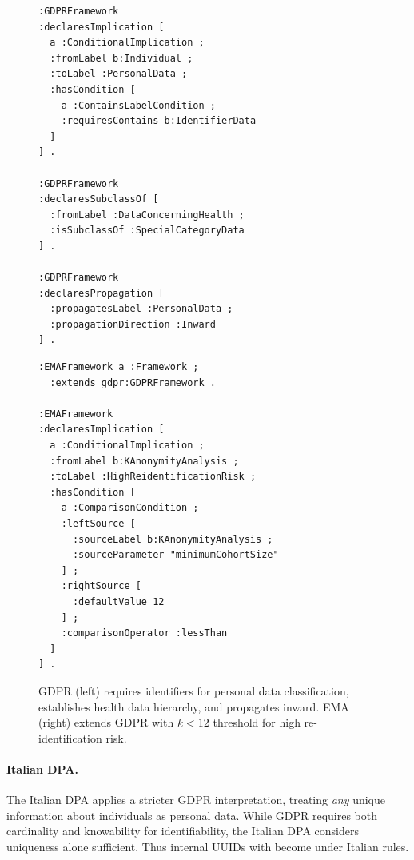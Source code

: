 \documentclass[runningheads,oneside]{llncs}
\newcommand{\sym}[1]{\text{\small\texttt{:{#1}}}}
\newcommand{\clabel}[1]{\sym{#1}}  %
\begin{document}
\begin{figure}[ht]
\centering
\begin{minipage}[t]{0.47\textwidth}
\begin{lstlisting}[basicstyle=\ttfamily\scriptsize, frame=none]
:GDPRFramework
:declaresImplication [
  a :ConditionalImplication ;
  :fromLabel b:Individual ;
  :toLabel :PersonalData ;
  :hasCondition [
    a :ContainsLabelCondition ;
    :requiresContains b:IdentifierData
  ]
] .

:GDPRFramework
:declaresSubclassOf [
  :fromLabel :DataConcerningHealth ;
  :isSubclassOf :SpecialCategoryData
] .

:GDPRFramework
:declaresPropagation [
  :propagatesLabel :PersonalData ;
  :propagationDirection :Inward
] .
\end{lstlisting}
\end{minipage}%
\hspace{0.3em}\textcolor{gray!50}{\vrule}\hspace{0.3em}%
\begin{minipage}[t]{0.50\textwidth}
\begin{lstlisting}[basicstyle=\ttfamily\scriptsize, frame=none, xleftmargin=0.25cm]
:EMAFramework a :Framework ;
  :extends gdpr:GDPRFramework .

:EMAFramework
:declaresImplication [
  a :ConditionalImplication ;
  :fromLabel b:KAnonymityAnalysis ;
  :toLabel :HighReidentificationRisk ;
  :hasCondition [
    a :ComparisonCondition ;
    :leftSource [
      :sourceLabel b:KAnonymityAnalysis ;
      :sourceParameter "minimumCohortSize"
    ] ;
    :rightSource [
      :defaultValue 12
    ] ;
    :comparisonOperator :lessThan
  ]
] .
\end{lstlisting}
\end{minipage}
\caption{GDPR (left) requires identifiers for personal data classification, establishes health data hierarchy, and propagates inward. EMA (right) extends GDPR with $k < 12$ threshold for high re-identification risk.}
\label{fig:gdpr-ema}
\end{figure}

\paragraph{Italian DPA.}
The Italian DPA applies a stricter GDPR interpretation, treating \emph{any} unique information about individuals as personal data. While GDPR requires both cardinality and knowability for identifiability, the Italian DPA considers uniqueness alone sufficient. Thus internal UUIDs with \clabel{ClosedKnowability} become \clabel{PersonalData} under Italian rules.
\end{document}
